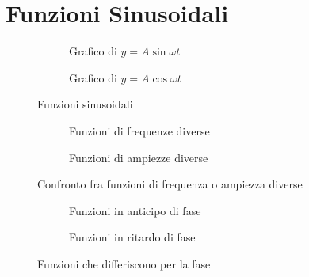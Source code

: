 \chapter{Funzioni Sinusoidali}
\label{sec:FunzioniSinusoidali}
\minitoc
\mtcskip                                %
\minilof                                %
\mtcskip                                %
\minilot
{}
\begin{figure}
	\begin{subfigure}[b]{.5\linewidth}
		\centering
		\caption{Grafico di $y=A\sin\omega t$}\label{fig:asinomegat}
	\end{subfigure}%
	\qquad\qquad
	\begin{subfigure}[b]{.5\linewidth}
		\centering
		\caption{Grafico di $y=A\cos\omega t$}\label{fig:acosomegat}
	\end{subfigure}
	\caption{Funzioni sinusoidali}
	\label{fig:Funzionisinusoidali}
\end{figure}
\begin{figure}
	\begin{subfigure}[b]{.5\linewidth}
		\centering
		\caption{Funzioni di frequenze diverse}\label{fig:frequenzediverse}
	\end{subfigure}%
		\qquad\qquad
	\begin{subfigure}[b]{.5\linewidth}
		\centering
		\caption{Funzioni di ampiezze diverse}\label{fig:ampiezzediverse}
	\end{subfigure}
	\caption{Confronto fra funzioni di frequenza o ampiezza diverse}
	\label{fig:ampiezzediversefrequenzediverse}
\end{figure}
\begin{figure}
	\begin{subfigure}[b]{.5\linewidth}
		\centering
		\caption{Funzioni in anticipo di fase}\label{fig:AsinomegaTSfasamentoAnticipato}
	\end{subfigure}%
		\qquad\qquad
	\begin{subfigure}[b]{.5\linewidth}
		\centering
		\caption{Funzioni in ritardo di fase}\label{fig:AsinomegaTSfasamentoRitardato}
	\end{subfigure}
	\caption{Funzioni che differiscono per la fase}%
	\label{fig:Funzionichedifferisconoperlafase}%
\end{figure}
